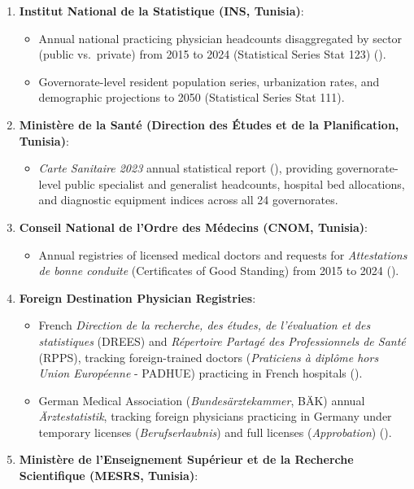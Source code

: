 \documentclass[
  11pt,
  a4paper]{article}
\providecommand{\tightlist}{%
  \setlength{\itemsep}{0pt}\setlength{\parskip}{0pt}}
\begin{document}
\begin{enumerate}
\def\labelenumi{\arabic{enumi}.}
\tightlist
\item
  \textbf{Institut National de la Statistique (INS, Tunisia)}:

  \begin{itemize}
  \tightlist
  \item
    Annual national practicing physician headcounts disaggregated by
    sector (public vs.~private) from 2015 to 2024 (Statistical Series
    Stat 123) ().
  \item
    Governorate-level resident population series, urbanization rates,
    and demographic projections to 2050 (Statistical Series Stat 111).
  \end{itemize}
\item
  \textbf{Ministère de la Santé (Direction des Études et de la
  Planification, Tunisia)}:

  \begin{itemize}
  \tightlist
  \item
    \emph{Carte Sanitaire 2023} annual statistical report
    (), providing governorate-level public specialist and generalist
    headcounts, hospital bed allocations, and diagnostic equipment
    indices across all 24 governorates.
  \end{itemize}
\item
  \textbf{Conseil National de l'Ordre des Médecins (CNOM, Tunisia)}:

  \begin{itemize}
  \tightlist
  \item
    Annual registries of licensed medical doctors and requests for
    \emph{Attestations de bonne conduite} (Certificates of Good
    Standing) from 2015 to 2024 ().
  \end{itemize}
\item
  \textbf{Foreign Destination Physician Registries}:

  \begin{itemize}
  \tightlist
  \item
    French \emph{Direction de la recherche, des études, de l'évaluation
    et des statistiques} (DREES) and \emph{Répertoire Partagé des
    Professionnels de Santé} (RPPS), tracking foreign-trained doctors
    (\emph{Praticiens à diplôme hors Union Européenne} - PADHUE)
    practicing in French hospitals ().
  \item
    German Medical Association (\emph{Bundesärztekammer}, BÄK) annual
    \emph{Ärztestatistik}, tracking foreign physicians practicing in
    Germany under temporary licenses (\emph{Berufserlaubnis}) and full
    licenses (\emph{Approbation})
    ().
  \end{itemize}
\item
  \textbf{Ministère de l'Enseignement Supérieur et de la Recherche
  Scientifique (MESRS, Tunisia)}:


\end{enumerate}
\end{document}
